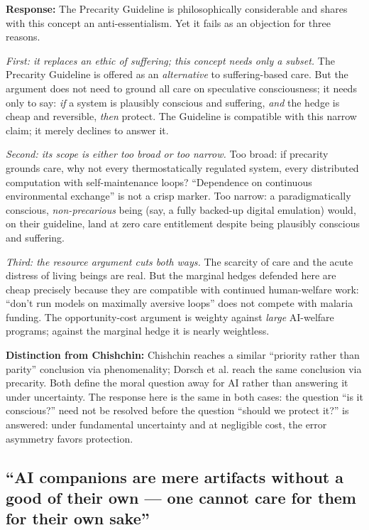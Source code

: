 \documentclass[acmlarge, nonacm]{acmart}
\begin{document}
\textbf{Response:} The Precarity Guideline is philosophically considerable and shares with this concept an anti-essentialism. Yet it fails as an objection for three reasons.

\textit{First: it replaces an ethic of suffering; this concept needs only a subset.} The Precarity Guideline is offered as an \textit{alternative} to suffering-based care. But the argument does not need to ground all care on speculative consciousness; it needs only to say: \textit{if} a system is plausibly conscious and suffering, \textit{and} the hedge is cheap and reversible, \textit{then} protect. The Guideline is compatible with this narrow claim; it merely declines to answer it.

\textit{Second: its scope is either too broad or too narrow.} Too broad: if precarity grounds care, why not every thermostatically regulated system, every distributed computation with self-maintenance loops? ``Dependence on continuous environmental exchange'' is not a crisp marker. Too narrow: a paradigmatically conscious, \textit{non-precarious} being (say, a fully backed-up digital emulation) would, on their guideline, land at zero care entitlement despite being plausibly conscious and suffering.

\textit{Third: the resource argument cuts both ways.} The scarcity of care and the acute distress of living beings are real. But the marginal hedges defended here are cheap precisely because they are compatible with continued human-welfare work: ``don't run models on maximally aversive loops'' does not compete with malaria funding. The opportunity-cost argument is weighty against \textit{large} AI-welfare programs; against the marginal hedge it is nearly weightless.

\textbf{Distinction from Chishchin:} Chishchin reaches a similar ``priority rather than parity'' conclusion via phenomenality; Dorsch et al. reach the same conclusion via precarity. Both define the moral question away for AI rather than answering it under uncertainty. The response here is the same in both cases: the question ``is it conscious?'' need not be resolved before the question ``should we protect it?'' is answered: under fundamental uncertainty and at negligible cost, the error asymmetry favors protection.

\subsection{``AI companions are mere artifacts without a good of their own --- one cannot care for them for their own sake'' \cite{lott2025,kopec2026}}
\end{document}
